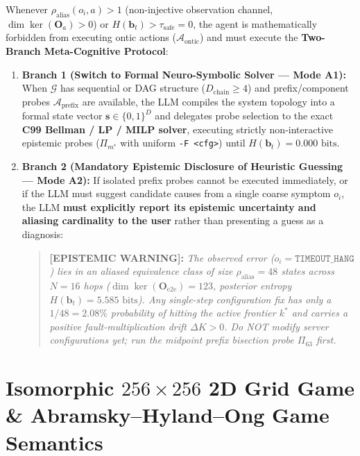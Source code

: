 \documentclass[11pt,a4paper]{article}
\theoremstyle{definition}
\theoremstyle{remark}
\begin{document}
Whenever $\rho_{\text{alias}}(o_i, a) > 1$ (non-injective observation channel, $\dim\ker(\mathbf{O}_a) > 0$) or $H(\bm{b}_t) > \tau_{\text{safe}} = 0$, the agent is mathematically forbidden from executing ontic actions ($\mathcal{A}_{\text{ontic}}$) and must execute the \textbf{Two-Branch Meta-Cognitive Protocol}:

\begin{enumerate}
    \item \textbf{Branch 1 (Switch to Formal Neuro-Symbolic Solver --- Mode A1):}
    When $\mathcal{G}$ has sequential or DAG structure ($D_{\text{chain}} \ge 4$) and prefix/component probes $\mathcal{A}_{\text{prefix}}$ are available, the LLM compiles the system topology into a formal state vector $\bm{s} \in \{0,1\}^D$ and delegates probe selection to the exact \textbf{C99 Bellman / LP / MILP solver}, executing strictly non-interactive epistemic probes ($\Pi_{m^*}$ with uniform \texttt{-F <cfg>}) until $H(\bm{b}_t) = 0.000\text{ bits}$.
    \item \textbf{Branch 2 (Mandatory Epistemic Disclosure of Heuristic Guessing --- Mode A2):}
    If isolated prefix probes cannot be executed immediately, or if the LLM must suggest candidate causes from a single coarse symptom $o_i$, the LLM \textbf{must explicitly report its epistemic uncertainty and aliasing cardinality to the user} rather than presenting a guess as a diagnosis:
    \begin{quote}
        \small\textbf{[EPISTEMIC WARNING]:} \textit{The observed error ($o_i = \texttt{TIMEOUT\_HANG}$) lies in an aliased equivalence class of size $\rho_{\text{alias}} = 48$ states across $N=16$ hops ($\dim\ker(\mathbf{O}_{\text{e2e}}) = 123$, posterior entropy $H(\bm{b}_t) = 5.585\text{ bits}$). Any single-step configuration fix has only a $1/48 = 2.08\%$ probability of hitting the active frontier $k^*$ and carries a positive fault-multiplication drift $\Delta K > 0$. Do NOT modify server configurations yet; run the midpoint prefix bisection probe $\Pi_{63}$ first.}
    \end{quote}
\end{enumerate}

\section{Isomorphic $256 \times 256$ 2D Grid Game \& Abramsky--Hyland--Ong Game Semantics}
\end{document}
